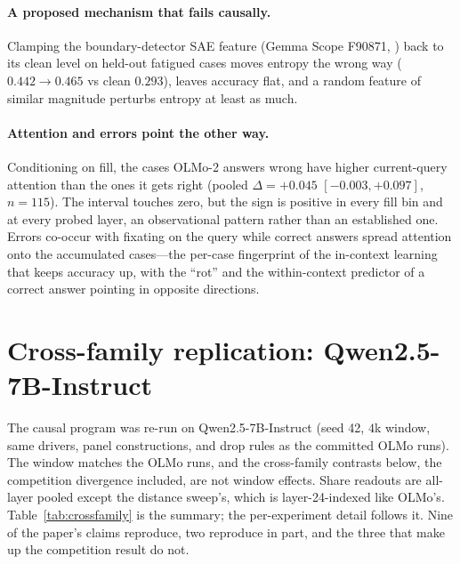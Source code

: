 \documentclass{article}
\begin{document}
\paragraph{A proposed mechanism that fails causally.}
Clamping the boundary-detector SAE feature (Gemma Scope F90871,
\citealp{lieberum2024gemmascope}) back to its clean level on held-out fatigued cases moves
entropy the wrong way ($0.442\to0.465$ vs clean $0.293$), leaves accuracy flat, and a
random feature of similar magnitude perturbs entropy at least as much.

\paragraph{Attention and errors point the other way.}
Conditioning on fill, the cases OLMo-2 answers wrong have higher current-query
attention than the ones it gets right (pooled $\Delta=+0.045$ $[-0.003,+0.097]$, $n{=}115$). The
interval touches zero, but the sign is positive in every fill bin and at every probed layer, an
observational pattern rather than an established one. Errors
co-occur with fixating on the query while correct answers spread attention onto the
accumulated cases---the per-case fingerprint of the in-context learning that keeps accuracy up,
with the ``rot'' and the within-context predictor of a correct answer pointing in opposite
directions.

\section{Cross-family replication: Qwen2.5-7B-Instruct}
\label{app:qwen}

The causal program was re-run on Qwen2.5-7B-Instruct (seed 42, $4$k window, same drivers,
panel
constructions, and drop rules as the committed OLMo runs). The window matches the OLMo runs,
and the cross-family contrasts below, the competition divergence included, are not window
effects. Share readouts are all-layer pooled
except the distance sweep's, which is layer-24-indexed like OLMo's.
Table~\ref{tab:crossfamily} is the summary; the per-experiment detail follows it. Nine of the
paper's claims reproduce, two reproduce in part, and the three that make up the competition
result do not.
\end{document}
